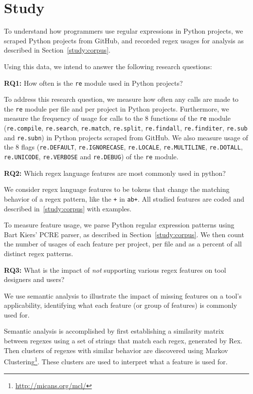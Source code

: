 \section{Study}
\label{sec:study}

To understand how programmers use regular expressions in Python projects, we scraped  Python projects from GitHub, and recorded regex usages for analysis as described in Section~\ref{study:corpus}.

Using this data, we intend to answer the following research questions:

\textbf{RQ1:} How often is the {\tt re} module used in Python projects?

To address this research question, we measure how often any calls are made to the {\tt re} module per file and per project in Python projects.  Furthermore, we measure the frequency of usage for calls to the 8 functions of the {\tt re} module ({\tt re.compile}, {\tt re.search}, {\tt re.match}, {\tt re.split}, {\tt re.findall}, {\tt re.finditer}, {\tt re.sub} and {\tt re.subn}) in Python projects scraped from GitHub.  We also measure usage of the 8 flags ({\tt re.DEFAULT}, {\tt re.IGNORECASE}, {\tt re.LOCALE}, {\tt re.MULTILINE}, {\tt re.DOTALL}, {\tt re.UNICODE}, {\tt re.VERBOSE} and {\tt re.DEBUG}) of the {\tt re} module.

\textbf{RQ2:} Which regex language features are most commonly used in python?

We consider regex language features to be tokens that change the matching behavior of a regex pattern, like the {\tt +} in {\tt ab+}.  All studied features are coded and described in~\ref{study:corpus} with examples.

To measure feature usage, we parse Python regular expression patterns using Bart Kiers' PCRE parser, as described in Section~\ref{study:corpus}.  We then count the number of usages of each feature per project, per file and as a percent of all distinct regex patterns.

\textbf{RQ3:} What is the impact of \emph{not} supporting various regex features on tool designers and users?

We use semantic analysis to illustrate the impact of missing features on a tool's applicability, identifying what each feature (or group of features) is commonly used for.

Semantic analysis is accomplished by first establishing a similarity matrix between regexes using a set of strings that match each regex, generated by Rex.  Then clusters of regexes with similar behavior are discovered using Markov Clustering\footnote{\url{http://micans.org/mcl/}}.  These clusters are used to interpret what a feature is used for.

